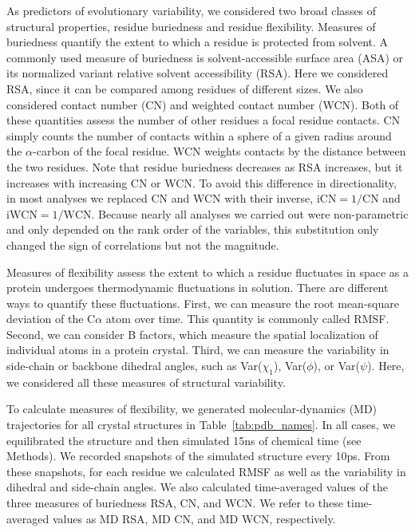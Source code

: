 \documentclass[12pt]{article}
\begin{document}
As predictors of evolutionary variability, we considered two broad classes of structural properties, residue buriedness and residue flexibility. Measures of buriedness quantify the extent to which a residue is protected from solvent. A commonly used measure of buriedness is solvent-accessible surface area (ASA) or its normalized variant relative solvent accessibility (RSA). Here we considered RSA, since it can be compared among residues of different sizes. We also considered contact number (CN) and weighted contact number (WCN). Both of these quantities assess the number of other residues a focal residue contacts. CN simply counts the number of contacts within a sphere of a given radius around the $\alpha$-carbon of the focal residue. WCN weights contacts by the distance between the two residues. Note that residue buriedness decreases as RSA increases, but it increases with increasing CN or WCN. To avoid this difference in directionality, in most analyses we replaced CN and WCN with their inverse, $\text{iCN}=1/\text{CN}$ and $\text{iWCN}=1/\text{WCN}$. Because nearly all analyses we carried out were non-parametric and only depended on the rank order of the variables, this substitution only changed the sign of correlations but not the magnitude.

Measures of flexibility assess the extent to which a residue fluctuates in space as a protein undergoes thermodynamic fluctuations in solution. There are different ways to quantify these fluctuations. First, we can measure the root mean-square deviation of the C$\alpha$ atom over time. This quantity is commonly called RMSF. Second, we can consider B factors, which measure the spatial localization of individual atoms in a protein crystal. Third, we can measure the variability in side-chain or backbone dihedral angles, such as Var($\chi_1$), Var($\phi$), or Var($\psi$). Here, we considered all these measures of structural variability.

To calculate measures of flexibility, we generated molecular-dynamics (MD) trajectories for all crystal structures in Table~\ref{tab:pdb_names}. In all cases, we equilibrated the structure and then simulated 15ns of chemical time (see Methods). We recorded snapshots of the simulated structure every 10ps. From these snapshots, for each residue we calculated RMSF as well as the variability in dihedral and side-chain angles. We also calculated time-averaged values of the three measures of buriedness RSA, CN, and WCN. We refer to these time-averaged values as MD RSA, MD CN, and MD WCN, respectively.
\end{document}
